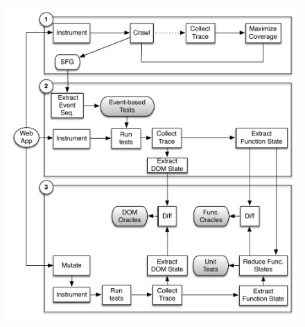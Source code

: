 \begin{figure}[!t]
  \centering
  \includegraphics[width=1\hsize]{fig/approach-view-revised}
  \vspace{-0.1in} 
  \label{Fig:approach-view}
  \vspace{-0.1in} 
\end{figure}

